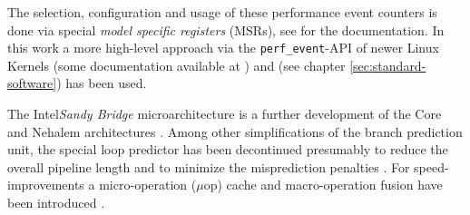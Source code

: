 The selection, configuration and usage of these performance event counters is
done via special \emph{model specific registers} (MSRs), see
\cite{intel2011softdev3b} for the documentation. In this work a more high-level
approach via the \texttt{perf\_event}-API of newer Linux Kernels (some
documentation available at \cite{weaver2011perfevents}) and 
(see chapter \ref{sec:standard-software}) has been used.



The Intel\TReg \emph{Sandy Bridge} microarchitecture is a further development of
the Core and Nehalem architectures \cite{fog11}. Among other simplifications of
the branch prediction unit, the special loop predictor has been decontinued
presumably to reduce the overall pipeline length and to minimize the
misprediction penalties \cite{fog11}. For speed-improvements a micro-operation
($\mu$op) cache and macro-operation fusion have been introduced \cite{fog11}.
